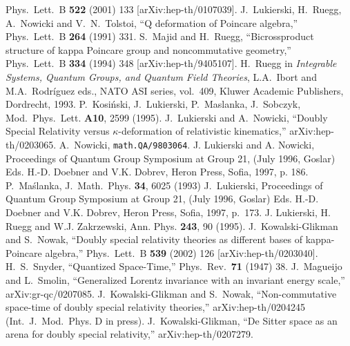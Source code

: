\documentclass[a4paper,a4paper]{article}
\begin{document}
\begin{thebibliography}{99}
Phys.\ Lett.\ B {\bf 522} (2001) 133
[arXiv:hep-th/0107039].
 J.~Lukierski, H.~Ruegg, A.~Nowicki and V.~N.~Tolstoi,
``Q deformation of Poincare algebra,''
Phys.\ Lett.\ B {\bf 264} (1991) 331.
 S.~Majid and H.~Ruegg,
``Bicrossproduct structure of kappa Poincare group and noncommutative geometry,''
Phys.\ Lett.\ B {\bf 334} (1994) 348
[arXiv:hep-th/9405107].
 H.~Ruegg in {\em Integrable Systems, Quantum Groups, and Quantum Field Theories}, L.A.~Ibort and M.A.~Rodr\'iguez eds., NATO ASI series, vol.~409, Kluwer Academic Publishers, Dordrecht, 1993.
 P.~Kosi\'nski, J.~Lukierski, P.~Maslanka, J.~Sobczyk, Mod.~Phys.~Lett. {\bf A10}, 2599 (1995).
 J.~Lukierski and A.~Nowicki,
``Doubly Special Relativity versus $\kappa$-deformation of relativistic kinematics,''
arXiv:hep-th/0203065.
  A.~Nowicki, {\tt math.QA/9803064}.
 J. Lukierski and A. Nowicki, Proceedings of
Quantum Group Symposium at Group 21, (July 1996, Goslar) Eds.
H.-D. Doebner and V.K. Dobrev, Heron Press, Sofia, 1997, p. 186.
 P.~Ma\'slanka, J.~Math.~Phys. {\bf 34}, 6025 (1993)
 J.~Lukierski, Proceedings of
Quantum Group Symposium at Group 21, (July 1996, Goslar) Eds.
H.-D. Doebner and V.K. Dobrev, Heron Press, Sofia, 1997, p.~173.
 J. Lukierski, H. Ruegg and W.J. Zakrzewski, Ann.
Phys. {\bf 243}, 90 (1995).
 J.~Kowalski-Glikman and S.~Nowak,
``Doubly special relativity theories as different bases of kappa-Poincare  algebra,''
Phys.\ Lett.\ B {\bf 539} (2002) 126
[arXiv:hep-th/0203040].
 H.~S.~Snyder,
``Quantized Space-Time,''
Phys.\ Rev.\  {\bf 71} (1947) 38.
J.~Magueijo and L.~Smolin,
``Generalized Lorentz invariance with an invariant energy scale,''
arXiv:gr-qc/0207085.
J.~Kowalski-Glikman and S.~Nowak,
``Non-commutative space-time of doubly special relativity theories,''
arXiv:hep-th/0204245 (Int.~J.~Mod.~Phys. D in press).  
J.~Kowalski-Glikman,
``De Sitter space as an arena for doubly special relativity,''
arXiv:hep-th/0207279.
\end{thebibliography}
\end{document}
